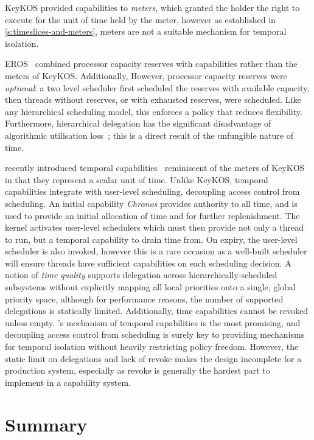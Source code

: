KeyKOS provided capabilities to \emph{meters}, which granted the holder
the right to execute for the unit of time held by the meter, however as established in 
\cref{s:timeslices-and-meters}, meters are not a suitable mechanism for temporal isolation.

EROS~\citep{Shapiro_SF_99} combined processor capacity reserves with capabilities rather than the
meters of KeyKOS. Additionally, 
However, processor capacity reserves were \emph{optional}: a two level scheduler first
scheduled the reserves with available capacity, then threads without reserves,
or with exhausted reserves, were scheduled.
Like any hierarchical scheduling model, this enforces a policy that
reduces flexibility.
Furthermore, hierarchical delegation has the significant disadvantage
of algorithmic utilisation loss~\citep{Lackorzynski_WVH_12}; this is a
direct result of the unfungible nature of time.

\composite recently introduced temporal capabilities~\citep{Gadepalli_GBKP_17} reminiscent of
the meters of KeyKOS in that they represent a scalar unit of time. 
Unlike KeyKOS, temporal capabilities integrate with user-level scheduling, decoupling access control
from scheduling. An initial capability \emph{Chronos} provides authority to all time, and is used to
provide an initial allocation of time and for further replenishment. 
The kernel activates user-level schedulers 
which must then provide not only a thread to run, but a temporal capability to drain time from.
On expiry, the user-level scheduler is also
invoked, however this is a rare occasion as a well-built scheduler will ensure threads have
sufficient capabilities on each scheduling decision.
 A notion of \emph{time quality} supports delegation across
hierarchically-scheduled subsystems without explicitly mapping all
local priorities onto a single, global priority space, although for performance reasons, the number
of supported delegations is statically limited.
Additionally, time capabilities cannot be revoked unless empty. 
\composite's mechanism of temporal capabilities is the most promising, and decoupling access
control from scheduling is surely key to providing mechanisms for temporal isolation without 
heavily restricting policy freedom. However, the static limit on delegations and lack of revoke
makes the design incomplete for a production system, especially as revoke is generally the hardest part to
implement in a capability system. 

\section{Summary}

